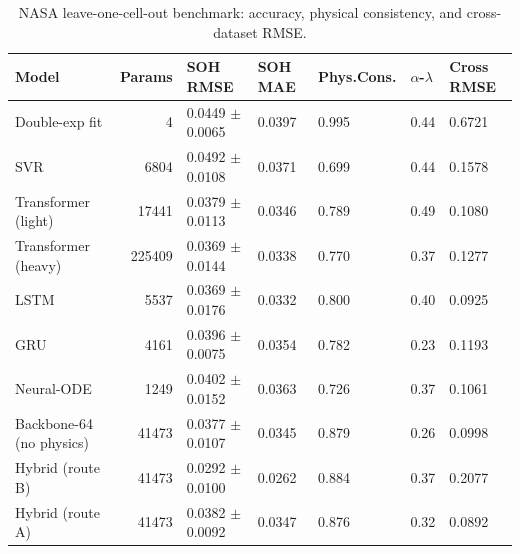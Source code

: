\begin{table}
\caption{NASA leave-one-cell-out benchmark: accuracy, physical consistency, and cross-dataset RMSE.}
\label{tab:t1_loco_benchmark}
\begin{tabular}{lrlllll}
\toprule
Model & Params & SOH RMSE & SOH MAE & Phys.Cons. & $\alpha$-$\lambda$ & Cross RMSE \\
\midrule
Double-exp fit & 4 & 0.0449 $\pm$ 0.0065 & 0.0397 & 0.995 & 0.44 & 0.6721 \\
SVR & 6804 & 0.0492 $\pm$ 0.0108 & 0.0371 & 0.699 & 0.44 & 0.1578 \\
Transformer (light) & 17441 & 0.0379 $\pm$ 0.0113 & 0.0346 & 0.789 & 0.49 & 0.1080 \\
Transformer (heavy) & 225409 & 0.0369 $\pm$ 0.0144 & 0.0338 & 0.770 & 0.37 & 0.1277 \\
LSTM & 5537 & 0.0369 $\pm$ 0.0176 & 0.0332 & 0.800 & 0.40 & 0.0925 \\
GRU & 4161 & 0.0396 $\pm$ 0.0075 & 0.0354 & 0.782 & 0.23 & 0.1193 \\
Neural-ODE & 1249 & 0.0402 $\pm$ 0.0152 & 0.0363 & 0.726 & 0.37 & 0.1061 \\
Backbone-64 (no physics) & 41473 & 0.0377 $\pm$ 0.0107 & 0.0345 & 0.879 & 0.26 & 0.0998 \\
Hybrid (route B) & 41473 & 0.0292 $\pm$ 0.0100 & 0.0262 & 0.884 & 0.37 & 0.2077 \\
Hybrid (route A) & 41473 & 0.0382 $\pm$ 0.0092 & 0.0347 & 0.876 & 0.32 & 0.0892 \\
\bottomrule
\end{tabular}
\end{table}
